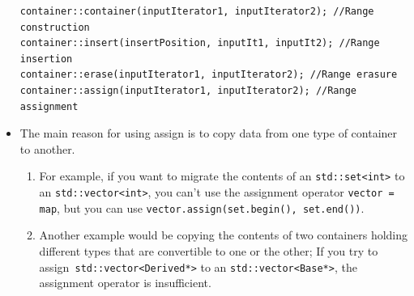 \documentclass[a4paper,11pt,twoside]{book}
\begin{document}
\begin{itemize}
\begin{lstlisting}[numbers=none]
container::container(inputIterator1, inputIterator2); //Range construction
container::insert(insertPosition, inputIt1, inputIt2); //Range insertion
container::erase(inputIterator1, inputIterator2); //Range erasure
container::assign(inputIterator1, inputIterator2); //Range assignment
\end{lstlisting}


\item The main reason for using assign is to copy data from one type of container to another.
\begin{enumerate}
\item For example, if you want to migrate the contents of an \texttt{std::set<int>} to an \texttt{std::vector<int>}, you can't use the assignment operator \texttt{vector = map}, but you can use \texttt{vector.assign(set.begin(), set.end())}.

\item Another example would be copying the contents of two containers holding different types that are convertible to one or the other; If you try to assign\texttt{ std::vector<Derived*>} to an \texttt{std::vector<Base*>}, the assignment operator is insufficient.

\end{enumerate}

\end{itemize}
\end{document}
